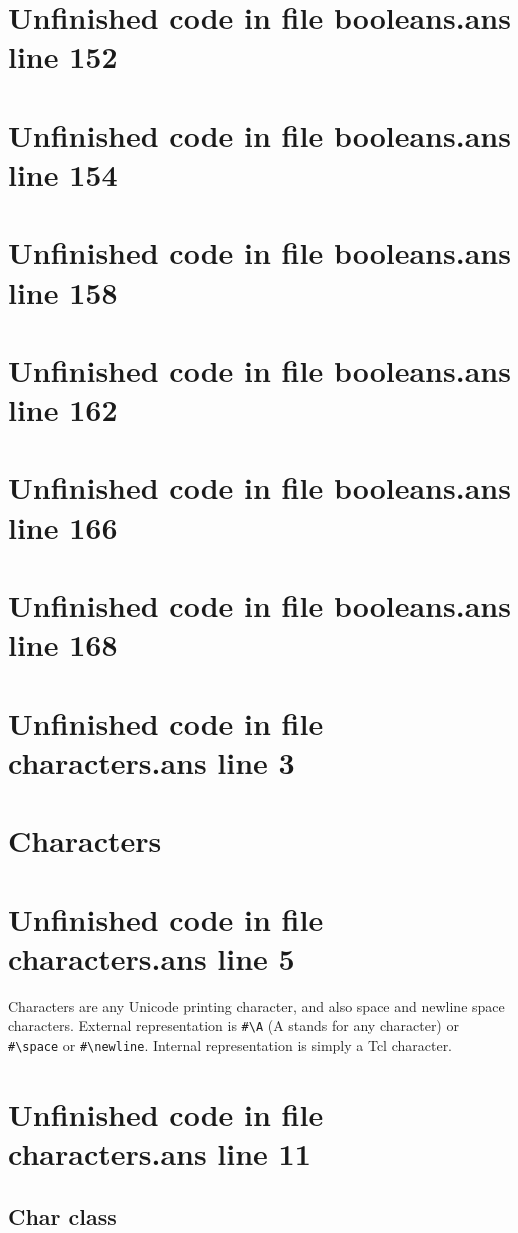 \documentclass[twoside,9pt]{report}
\begin{document}
\section{Unfinished code in file booleans.ans line 152}
\section{Unfinished code in file booleans.ans line 154}
\section{Unfinished code in file booleans.ans line 158}
\section{Unfinished code in file booleans.ans line 162}
\section{Unfinished code in file booleans.ans line 166}
\section{Unfinished code in file booleans.ans line 168}
\section{Unfinished code in file characters.ans line 3}
\section{Characters}
\label{characters}
\section{Unfinished code in file characters.ans line 5}


Characters are any Unicode printing character, and also space and newline space characters. External representation is \texttt{\#\textbackslash A} (A stands for any character) or \texttt{\#\textbackslash space} or \texttt{\#\textbackslash newline}. Internal representation is simply a Tcl character.

\section{Unfinished code in file characters.ans line 11}
\subsection{Char class}
\label{char-class}
\end{document}
